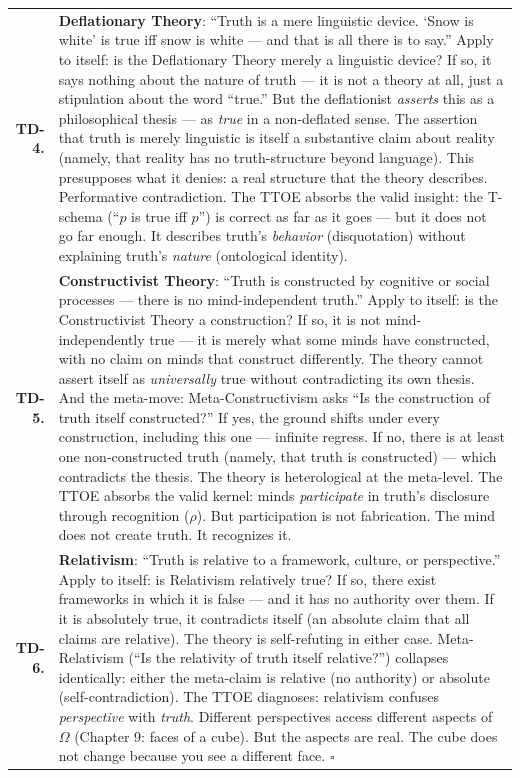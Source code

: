 \documentclass[10pt, openany, oneside]{book}
\renewcommand{\footnotesize}{\fontsize{8.5}{11}\selectfont}
\begin{document}
\vspace{0.5em}

{\footnotesize
\noindent\begin{tabular}{r p{}}
\textbf{TD-4.} & \textbf{Deflationary Theory}: ``Truth is a mere linguistic device. `Snow is white' is true iff snow is white --- and that is all there is to say.'' Apply to itself: is the Deflationary Theory merely a linguistic device? If so, it says nothing about the nature of truth --- it is not a theory at all, just a stipulation about the word ``true.'' But the deflationist \textit{asserts} this as a philosophical thesis --- as \textit{true} in a non-deflated sense. The assertion that truth is merely linguistic is itself a substantive claim about reality (namely, that reality has no truth-structure beyond language). This presupposes what it denies: a real structure that the theory describes. Performative contradiction. The TTOE absorbs the valid insight: the T-schema (``$p$ is true iff $p$'') is correct as far as it goes --- but it does not go far enough. It describes truth's \textit{behavior} (disquotation) without explaining truth's \textit{nature} (ontological identity). \\[0.5em]
\textbf{TD-5.} & \textbf{Constructivist Theory}: ``Truth is constructed by cognitive or social processes --- there is no mind-independent truth.'' Apply to itself: is the Constructivist Theory a construction? If so, it is not mind-independently true --- it is merely what some minds have constructed, with no claim on minds that construct differently. The theory cannot assert itself as \textit{universally} true without contradicting its own thesis. And the meta-move: Meta-Constructivism asks ``Is the construction of truth itself constructed?'' If yes, the ground shifts under every construction, including this one --- infinite regress. If no, there is at least one non-constructed truth (namely, that truth is constructed) --- which contradicts the thesis. The theory is heterological at the meta-level. The TTOE absorbs the valid kernel: minds \textit{participate} in truth's disclosure through recognition ($\rho$). But participation is not fabrication. The mind does not create truth. It recognizes it. \\[0.5em]
\textbf{TD-6.} & \textbf{Relativism}: ``Truth is relative to a framework, culture, or perspective.'' Apply to itself: is Relativism relatively true? If so, there exist frameworks in which it is false --- and it has no authority over them. If it is absolutely true, it contradicts itself (an absolute claim that all claims are relative). The theory is self-refuting in either case. Meta-Relativism (``Is the relativity of truth itself relative?'') collapses identically: either the meta-claim is relative (no authority) or absolute (self-contradiction). The TTOE diagnoses: relativism confuses \textit{perspective} with \textit{truth}. Different perspectives access different aspects of $\Omega$ (Chapter 9: faces of a cube). But the aspects are real. The cube does not change because you see a different face. $\square$ \\[0.3em]
\end{tabular}
}
\end{document}
